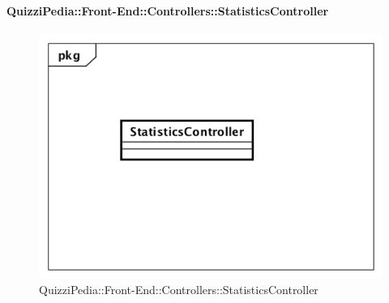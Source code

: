 \paragraph{QuizziPedia::Front-End::Controllers::StatisticsController}
\begin{figure} [ht]
	\centering
	\includegraphics[scale=0.45]{UML/Classi/Front-End/QuizziPedia_Front-end_Controller_StatisticsController.png}
	\caption{QuizziPedia::Front-End::Controllers::StatisticsController}
\end{figure} \FloatBarrier
